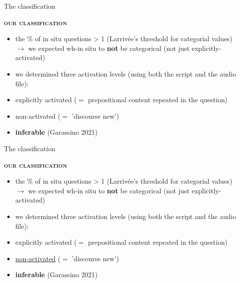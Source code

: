 \documentclass[lesson_slides]{subfiles}
\begin{document}
\begin{frame}{The classification}

    \textbf{\textsc{our classification}} \pause
    \begin{itemize}
        \item[\ding{227}] the \% of in situ questions > 1 (Larrivée's threshold for categorial values)\\ \pause $\longrightarrow$ we expected wh-in situ to \textbf{not} be categorical \pause (not just explicitly-activated) \pause
        \item[\ding{227}] we determined three activation levels (using both the script and the audio file): \pause
        \item[\ding{227}] explicitly activated ($=$ prepositional content repeated in the question) \pause
        \item[\ding{227}] non-activated ($=$ 'discourse new') \pause
        \item[\ding{227}] \textbf{inferable} \pause (Garassino 2021)
            
    \end{itemize}

\end{frame}
\begin{frame}{The classification}

    \textbf{\textsc{our classification}}
    \begin{itemize}
        \item[\ding{227}] the \% of in situ questions > 1 (Larrivée's threshold for categorial values)\\ $\longrightarrow$ we expected wh-in situ to \textbf{not} be categorical (not just explicitly-activated)
        \item[\ding{227}] we determined three activation levels (using both the script and the audio file):
        \item[\ding{227}] explicitly activated ($=$ prepositional content repeated in the question)
        \item[\ding{227}] \underline{non-activated} ($=$ 'discourse new')
        \item[\ding{227}] \textbf{inferable} (Garassino 2021)
            
    \end{itemize}

\end{frame}
\end{document}

